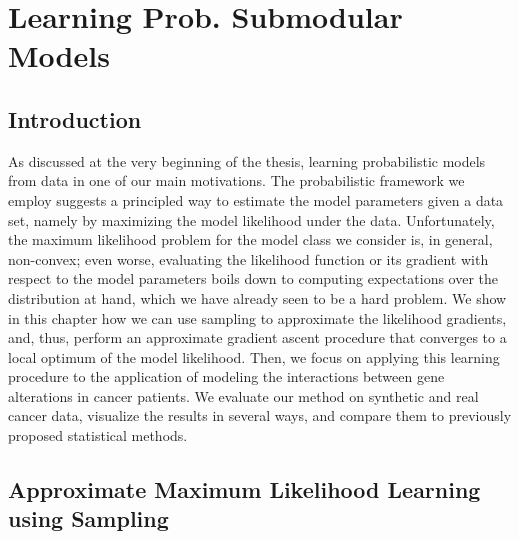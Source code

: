 \chapter{Learning Prob. Submodular Models} \label{ch:genes}

\section{Introduction}
As discussed at the very beginning of the thesis, learning probabilistic models from data in one of our main motivations.
The probabilistic framework we employ suggests a principled way to estimate the model parameters given a data set, namely by maximizing the model likelihood under the data.
Unfortunately, the maximum likelihood problem for the model class we consider is, in general, non-convex; even worse, evaluating the likelihood function or its gradient with respect to the model parameters boils down to computing expectations over the distribution at hand, which we have already seen to be a hard problem.
We show in this chapter how we can use sampling to approximate the likelihood gradients, and, thus, perform an approximate gradient ascent procedure that converges to a local optimum of the model likelihood.
Then, we focus on applying this learning procedure to the application of modeling the interactions between gene alterations in cancer patients.
We evaluate our method on synthetic and real cancer data, visualize the results in several ways, and compare them to previously proposed statistical methods.


\section{Approximate Maximum Likelihood Learning using Sampling} \label{sect:ml}

